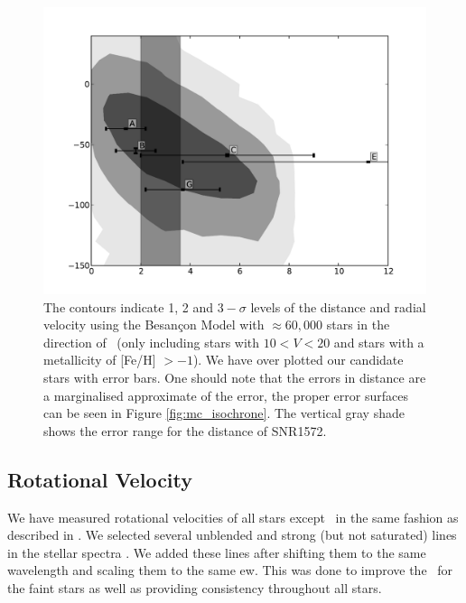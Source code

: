 \begin{figure}[tb] %
   \centering
   \includegraphics[width=\textwidth]{chapter_sn1572_hires/plots/dist_vr.pdf} 
   \caption[Radial velocity of all candidate stars in SN 1572 with the Besan\c{c}on Model]{The contours indicate 1, 2 and $3-\sigma$ levels of the distance and radial velocity using the Besan\c{c}on Model \citep{2003A&A...409..523R} with $\approx 60,000$ stars in the direction of \ (only including stars with $10  < V < 20$ and stars with a metallicity of [Fe/H] $> -1$). We have over plotted our candidate stars with error bars. One should note that the errors in distance are a marginalised approximate of the error, the proper error surfaces can be seen in Figure \ref{fig:mc_isochrone}. The vertical gray shade shows the error range for the distance of SNR1572.}
   \label{fig:dist_vr}
\end{figure}



\subsection{Rotational Velocity}
\label{sec:rotation}
We have measured rotational velocities of all stars except \starb\ in the same fashion as described in \wek. We selected several unblended and strong (but not saturated)  lines in the stellar spectra .  We added these lines after shifting them to the same wavelength and scaling them to the same \gls{ew}. This was done to improve the \snratio\ for the faint stars as well as providing consistency throughout all stars. 

